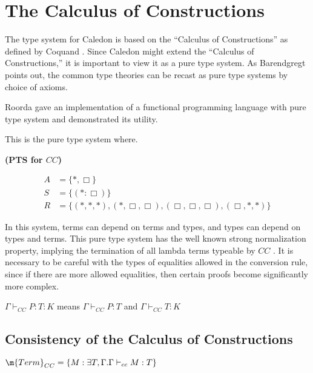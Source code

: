 \section{The Calculus of Constructions}

The type system for Caledon is based on the ``Calculus of Constructions'' as defined by Coquand \citep{coquand1986calculus}.
Since Caledon might extend the ``Calculus of Constructions,'' it is important to view it as a pure type system. 
As Barendgregt points out, the common type theories can be recast as pure type systems
by choice of axioms. 

Roorda \citep{roorda2001pure} gave an implementation of a functional programming language with 
pure type system and demonstrated its utility.

This is the pure type system where.

\begin{definition}
\textbf{(PTS for $CC$)}

\begin{align}
A &= \{ *, \Box \}
\\
S &= \{ (* : \Box) \}
\\
R &= \{ (*,*,*),(*,\Box,\Box),(\Box,\Box,\Box),(\Box,*,*)\}
\end{align}  

\label{coc:types}
\end{definition}

In this system, terms can depend on terms and types, 
and types can depend on types and terms.  
This pure type system has the well known strong normalization property, implying the termination of 
all lambda terms typeable by $CC$ \citep{Geuvers94ashort} \citep{geuvers1991modular}.
It is necessary to be careful with the types of equalities allowed in the conversion rule, 
since if there are more allowed equalities, then certain proofs
become significantly more complex.

\begin{definition}
$\Gamma \vdash_{CC} P : T : K$ means $\Gamma \vdash_{CC} P : T$ and $\Gamma \vdash_{CC} T : K$
\end{definition}


\subsection{Consistency of the Calculus of Constructions}

\begin{definition}
$ \m{Term}_{CC}  = \{ M : \exists T,\Gamma . \Gamma \vdash_{cc} M : T \}$
\end{definition}

